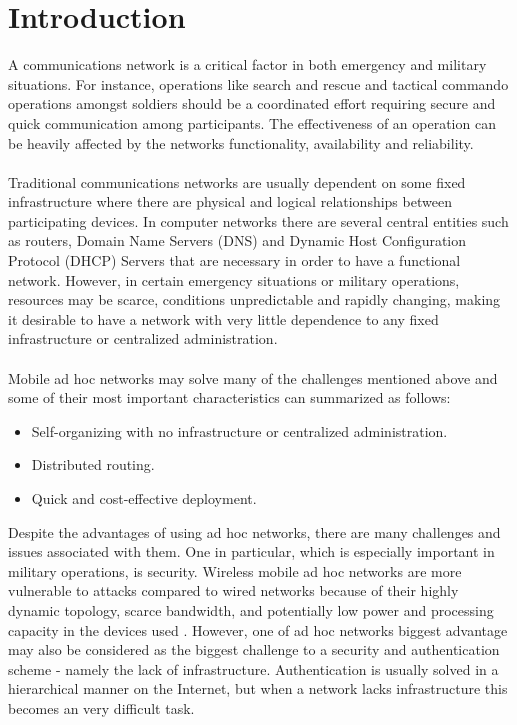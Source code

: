 \chapter{Introduction}
\label{introduction}
A communications network is a critical factor in both emergency and military situations. For instance, operations like search and rescue and tactical commando operations amongst soldiers should be a coordinated effort requiring secure and quick communication among participants. The effectiveness of an operation can be heavily affected by the networks functionality, availability and reliability.
\\\\
Traditional communications networks are usually dependent on some fixed infrastructure where there are physical and logical relationships between participating devices. In computer networks there are several central entities such as routers, Domain Name Servers (DNS) and Dynamic Host Configuration Protocol (DHCP) Servers that are necessary in order to have a functional network. However, in certain emergency situations or military operations, resources may be scarce, conditions unpredictable and rapidly changing, making it desirable to have a network with very little dependence to any fixed infrastructure or centralized administration.
\\\\
Mobile ad hoc networks may solve many of the challenges mentioned above and some of their most important characteristics can summarized as follows:

\begin{itemize}
\item Self-organizing with no infrastructure or centralized administration.
\item Distributed routing.
\item Quick and cost-effective deployment.
\end{itemize}

\noindent
Despite the advantages of using ad hoc networks, there are many challenges and issues associated with them. One in particular, which is especially important in military operations, is security. Wireless mobile ad hoc networks are more vulnerable to attacks compared to wired networks because of their highly dynamic topology, scarce bandwidth, and potentially low power and processing capacity in the devices used \cite{murthy-ad}. However, one of ad hoc networks biggest advantage may also be considered as the biggest challenge to a security and authentication scheme - namely the lack of infrastructure. Authentication is usually solved in a hierarchical manner on the Internet, but when a network lacks infrastructure this becomes an very difficult task.

